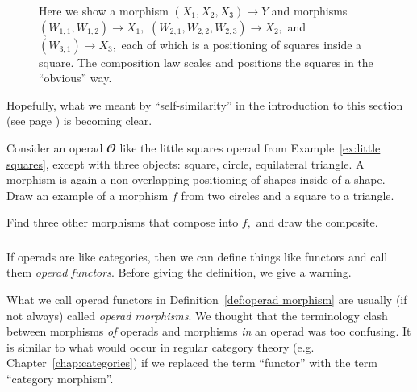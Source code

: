 \documentclass[../main/CT4S-EN-RU]{subfiles}
\begin{document}
\begin{exampleENG}
\begin{figure}[H]
\begin{center}
\end{center}
\caption{Here we show a morphism $(X_1,X_2,X_3){→} Y$ and morphisms $(W_{1,1},W_{1,2}){→} X_1,$ $(W_{2,1},W_{2,2},W_{2,3}){→} X_2,$ and $(W_{3,1}){→} X_3,$ each of which is a positioning of squares inside a square. The composition law scales and positions the squares in the “obvious” way.}
\label{fig:composition law for squares}
\end{figure}

Hopefully, what we meant by “self-similarity” in the introduction to this section (see page \pageref{sec:operad}) is becoming clear.
\end{exampleENG}

\begin{exampleRUS}\label{ex:little squares}
\end{exampleRUS}

\begin{exerciseENG}\label{exc:little shapes}
Consider an operad ${𝓞}$ like the little squares operad from Example~\ref{ex:little squares}, except with three objects: square, circle, equilateral triangle. A morphism is again a non-overlapping positioning of shapes inside of a shape. 
\sexc Draw an example of a morphism $f$ from two circles and a square to a triangle.
\item Find three other morphisms that compose into $f,$ and draw the composite.
\endsexc
\end{exerciseENG}

\begin{exerciseRUS}\label{exc:little shapes}
\end{exerciseRUS}


\subsubsection{}

\begin{blockENG}
If operads are like categories, then we can define things like functors and call them {\em operad functors}. Before giving the definition, we give a warning.
\end{blockENG}

\begin{blockRUS}
\end{blockRUS}

\begin{warningENG}
What we call operad functors in Definition~\ref{def:operad morphism} are usually (if not always) called {\em operad morphisms}. We thought that the terminology clash between morphisms {\em of} operads and morphisms {\em in} an operad was too confusing. It is similar to what would occur in regular category theory (e.g. Chapter~\ref{chap:categories}) if we replaced the term “functor” with the term “category morphism”. 
\end{warningENG}
\end{document}
